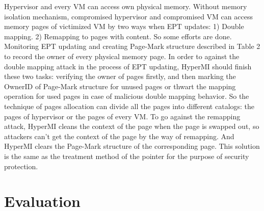\documentclass[conference]{IEEEtran}
\begin{document}
Hypervisor and every VM can access own physical memory. Without memory isolation mechanism, compromised hypervisor and compromised VM can access memory pages of victimized VM by two ways when EPT updates: 1) Double mapping. 2) Remapping to pages with content. So some efforts are done. Monitoring EPT updating and creating Page-Mark structure described in Table 2 to record the owner of every physical memory page. 
In order to against the double mapping attack in the process of EPT updating, HyperMI should finish these two tasks: verifying the owner of pages firstly, and then marking the OwnerID of Page-Mark structure for unused pages or thwart the mapping operation for used pages in case of malicious double mapping behavior. So the technique of pages allocation can divide all the pages into different catalogs: the pages of hypervisor or the pages of every VM.
To go against the remapping attack, HyperMI cleans the context of the page when the page is swapped out, so attackers can't get the context of the page by the way of remapping. And HyperMI clears the Page-Mark structure of the corresponding page. This solution is the same as the treatment method of the pointer for the purpose of security protection. 
\section{Evaluation}\label{sec:evaluation}
\end{document}
